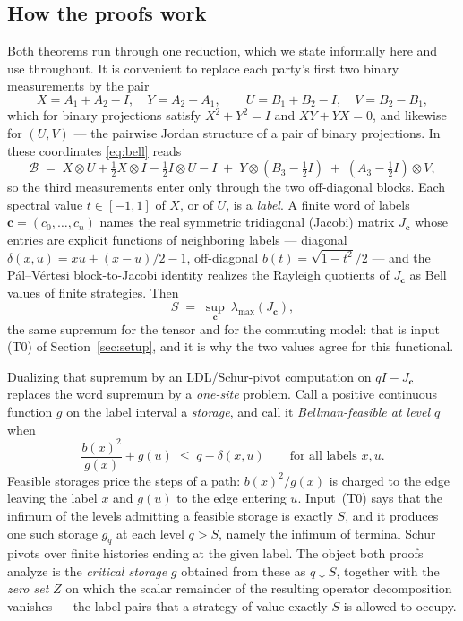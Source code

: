 \documentclass[11pt]{article}
\theoremstyle{remark}
\newcommand{\B}{\mathcal{B}}
\begin{document}
\subsection*{How the proofs work}

Both theorems run through one reduction, which we state informally here and
use throughout. It is convenient to replace each party's first two binary
measurements by the pair
\[
X=A_1+A_2-I,\quad Y=A_2-A_1,\qquad U=B_1+B_2-I,\quad V=B_2-B_1,
\]
which for binary projections satisfy $X^2+Y^2=I$ and $XY+YX=0$, and likewise
for $(U,V)$ --- the pairwise Jordan structure of a pair of binary
projections. In these coordinates \eqref{eq:bell} reads
\[
\B \;=\; X\otimes U+\tfrac12 X\otimes I-\tfrac12 I\otimes U-I
\;+\;Y\otimes(B_3-\tfrac12 I)\;+\;(A_3-\tfrac12 I)\otimes V ,
\]
so the third measurements enter only through the two off-diagonal blocks.
Each spectral value $t\in[-1,1]$ of $X$, or of $U$, is a \emph{label}. A
finite word of labels $\mathbf c=(c_0,\dots,c_n)$ names the real symmetric
tridiagonal (Jacobi) matrix $J_{\mathbf c}$ whose entries are explicit
functions of neighboring labels --- diagonal
$\delta(x,u)=xu+(x-u)/2-1$, off-diagonal $b(t)=\sqrt{1-t^2}/2$ --- and the
P\'al--V\'ertesi block-to-Jacobi identity realizes the Rayleigh quotients of
$J_{\mathbf c}$ as Bell values of finite strategies. Then
\[
  S \;=\; \sup_{\mathbf c}\ \lambda_{\max}(J_{\mathbf c}),
\]
the same supremum for the tensor and for the commuting model: that is input
(T0) of Section~\ref{sec:setup}, and it is why the two values agree for this functional.

Dualizing that supremum by an LDL/Schur-pivot computation on
$qI-J_{\mathbf c}$ replaces the word supremum by a \emph{one-site} problem.
Call a positive continuous function $g$ on the label interval a
\emph{storage}, and call it \emph{Bellman-feasible at level $q$} when
\[
  \frac{b(x)^2}{g(x)} + g(u) \;\le\; q-\delta(x,u)
  \qquad\text{for all labels } x,u .
\]
Feasible storages price the steps of a path: $b(x)^2/g(x)$ is charged to the
edge leaving the label $x$ and $g(u)$ to the edge entering $u$. Input~(T0)
says that the infimum of the levels admitting a feasible storage is exactly
$S$, and it produces one such storage $g_q$ at each level $q>S$, namely the
infimum of terminal Schur pivots over finite histories ending at the given
label. The object both proofs analyze is the \emph{critical storage} $g$
obtained from these as $q\downarrow S$, together with the \emph{zero set}
$Z$ on which the scalar remainder of the resulting operator decomposition
vanishes --- the label pairs that a strategy of value exactly $S$ is allowed to
occupy.
\end{document}
